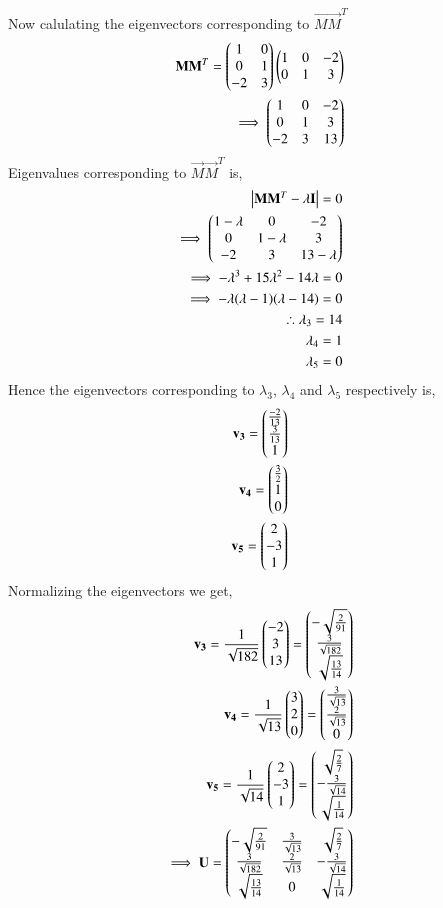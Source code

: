 \documentclass[journal,12pt,twocolumn]{IEEEtran}
\begin{document}
Now calulating the eigenvectors corresponding to $\vec{MM}^T$
\begin{align}
\mathbf{MM}^T = \begin{pmatrix}1&0\\0&1\\-2&3\end{pmatrix}\begin{pmatrix}1&0&-2\\0&1&3\end{pmatrix} \\\implies \begin{pmatrix}1&0&-2\\0&1&3\\-2&3&13\end{pmatrix}
\end{align}
Eigenvalues corresponding to $\vec{M}\vec{M}^T$  is,
\begin{align}
\begin{vmatrix}\mathbf{M}\mathbf{M}^T-\lambda\mathbf{I}\end{vmatrix} = 0\\
\implies \begin{pmatrix}1-\lambda&0&-2\\0&1-\lambda&3\\-2&3&13-\lambda\end{pmatrix}\\
\implies -\lambda^3+15\lambda^2-14\lambda = 0\\
\implies -\lambda(\lambda-1)(\lambda-14) = 0\\
\therefore \lambda_3 = 14 \label{lambda3}\\ 
\lambda_4 = 1\label{lambda4}\\
\lambda_5 = 0\label{lambda5}
\end{align} 
Hence the eigenvectors corresponding to $\lambda_3$, $\lambda_4$ and  $\lambda_5$ respectively is,
\begin{align}
\mathbf{v_3} =\begin{pmatrix}\frac{-2}{13}\\\frac{3}{13}\\1\end{pmatrix}\\
\mathbf{v_4} =\begin{pmatrix}\frac{3}{2}\\1\\0\end{pmatrix}\\
\mathbf{v_5} = \begin{pmatrix}2\\-3\\1\end{pmatrix}
\end{align}
Normalizing the eigenvectors we get,
\begin{align}
\mathbf{v_3} = \frac{1}{\sqrt{182}}\begin{pmatrix}-2\\3\\13\end{pmatrix} = \begin{pmatrix}-\sqrt{\frac{2}{91}}\\\frac{3}{\sqrt{182}}\\\sqrt{\frac{13}{14}}\end{pmatrix}\\
\mathbf{v_4} = \frac{1}{\sqrt{13}}\begin{pmatrix}3\\2\\0\end{pmatrix} = \begin{pmatrix}\frac{3}{\sqrt{13}}\\\frac{2}{\sqrt{13}}\\0\end{pmatrix}\\
\mathbf{v_5} = \frac{1}{\sqrt{14}}\begin{pmatrix}2\\-3\\1\end{pmatrix}= \begin{pmatrix}\sqrt{\frac{2}{7}}\\-\frac{3}{\sqrt{14}}\\\sqrt{\frac{1}{14}}\end{pmatrix}\\
\implies \mathbf{U} = \begin{pmatrix}-\sqrt{\frac{2}{91}} &\frac{3}{\sqrt{13}} & \sqrt{\frac{2}{7}}\\\frac{3}{\sqrt{182}} &\frac{2}{\sqrt{13}} &-\frac{3}{\sqrt{14}} \\\sqrt{\frac{13}{14}} &0 & \sqrt{\frac{1}{14}}\end{pmatrix} \label{U}
\end{align} 
\end{document}
